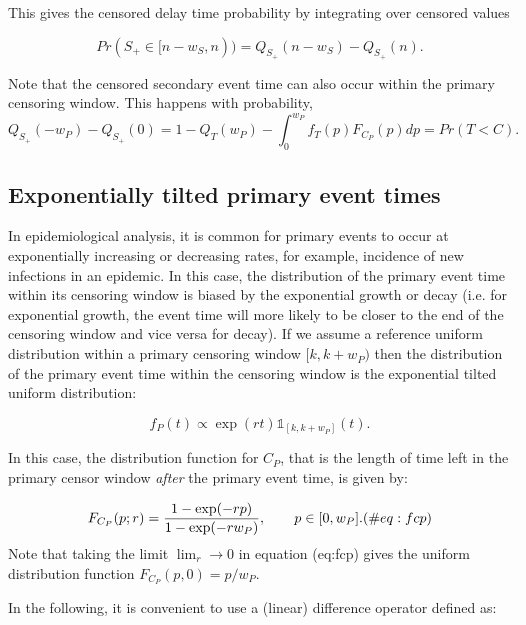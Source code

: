 \documentclass[10pt,letterpaper]{article}
\begin{document}
This gives the censored delay time probability by integrating over censored values

\begin{equation}
\label{eq:seccensorprob}
Pr(S_+ \in [n - w_S, n)) = Q_{S_+}(n-w_S) - Q_{S_+}(n).
\end{equation}


Note that the censored secondary event time can also occur within the primary censoring window. This happens with probability,
\begin{equation}
Q_{S_+}(-w_P) - Q_{S_+}(0) = 1 - Q_T(w_P) - \int_0^{w_P} f_T(p) F_{C_P}(p) dp = Pr(T< C).
\end{equation}

\subsection{Exponentially tilted primary event times}
In epidemiological analysis, it is common for primary events to occur at exponentially increasing or decreasing rates, for example, incidence of new infections in an epidemic. In this case, the distribution of the primary event time within its censoring window is biased by the exponential growth or decay \cite{Park2024.01.12.24301247} (i.e. for exponential growth, the event time will more likely to be closer to the end of the censoring window and vice versa for decay). If we assume a reference uniform distribution within a primary censoring window $[k, k + w_P)$ then the distribution of the primary event time within the censoring window is the exponential tilted uniform distribution:

\begin{equation}
f_P(t) \propto \exp(r t) \mathbb{1}_{[k, k + w_P]}(t).
\end{equation}

In this case, the distribution function for $C_P$, that is the length of time left in the primary censor window \textit{after} the primary event time, is given by:

\begin{equation}
F_{C_P}(p; r) = {  1 - \exp(-r p) \over 1 - \exp(-r w_P)}, \qquad p \in [0, w_P]. (\#eq:fcp)
\end{equation}
Note that taking the limit $\lim_r \rightarrow 0$ in equation \@ref(eq:fcp) gives the uniform distribution function $F_{C_P}(p, 0) = p / w_P$.

In the following, it is convenient to use a (linear) difference operator defined as:
\end{document}
